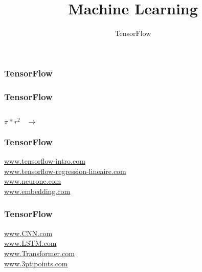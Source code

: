 \documentclass{formation}
\title{Machine Learning}
\subtitle{TensorFlow}
\begin{document}
\begin{frame}
  \frametitle{TensorFlow}
\end{frame}

\begin{frame}
  \frametitle{TensorFlow}
  \begin{minipage}[l]{0.15\linewidth}
      $\;$
  \end{minipage}\hfill
  \begin{minipage}[l]{0.35\linewidth}
    \huge
    \begin{center}
      $\pi*r^2\;\;\;\rightarrow$
    \end{center}
  \end{minipage}\hfill
  \begin{minipage}[l]{0.49\linewidth}
  \end{minipage}\hfill
\end{frame}

\begin{frame}
  \frametitle{TensorFlow}
  \begin{center}
  \href{https://colab.research.google.com/notebooks/mlcc/tensorflow_programming_concepts.ipynb}{www.tensorflow-intro.com}\\
  \href{https://colab.research.google.com/notebooks/mlcc/first_steps_with_tensor_flow.ipynb}{www.tensorflow-regression-lineaire.com}\\
  \href{https://colab.research.google.com/notebooks/mlcc/intro_to_neural_nets.ipynb}{www.neurone.com}\\
  \href{https://colab.research.google.com/notebooks/mlcc/intro_to_sparse_data_and_embeddings.ipynb}{www.embedding.com}
  \end{center}
\end{frame}

\begin{frame}
  \frametitle{TensorFlow}
  \begin{center}
    \href{https://colab.research.google.com/github/csc-training/intro-to-dl/blob/master/day1/keras-mnist-cnn.ipynb}{www.CNN.com}\\
    \href{https://colab.research.google.com/github/csc-training/intro-to-dl/blob/master/day1/keras-imdb-rnn.ipynb}{www.LSTM.com}\\
    \href{https://colab.research.google.com/github/tensorflow/docs/blob/master/site/en/r2/tutorials/text/transformer.ipynb}{www.Transformer.com}\\
    \href{https://www.google.com}{www.3ptipoints.com}\\
  \end{center}
\end{frame}
\end{document}

